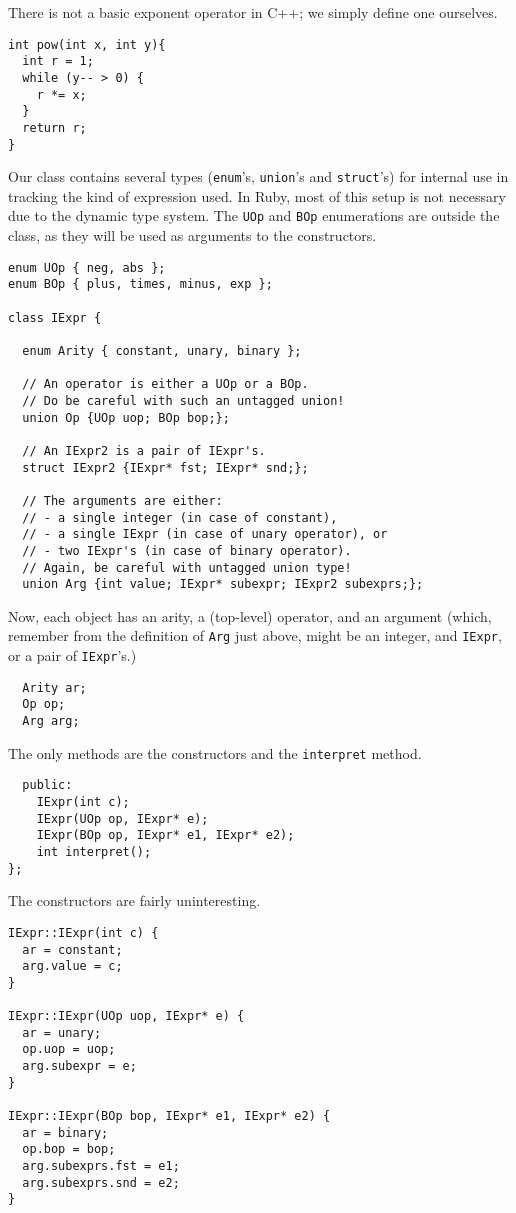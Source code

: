\documentclass[11pt]{article}
\begin{document}
There is not a basic exponent operator in C++;
we simply define one ourselves.
\begin{verbatim}
int pow(int x, int y){
  int r = 1;
  while (y-- > 0) {
    r *= x;
  }
  return r;
}
\end{verbatim}

Our class contains several types (\texttt{enum}'s, \texttt{union}'s and \texttt{struct}'s)
for internal use in tracking the kind of expression used.
In Ruby, most of this setup is not necessary due to
the dynamic type system.
The \texttt{UOp} and \texttt{BOp} enumerations are outside the class,
as they will be used as arguments to the constructors.
\begin{verbatim}
enum UOp { neg, abs };
enum BOp { plus, times, minus, exp };

class IExpr {

  enum Arity { constant, unary, binary };

  // An operator is either a UOp or a BOp.
  // Do be careful with such an untagged union!
  union Op {UOp uop; BOp bop;};

  // An IExpr2 is a pair of IExpr's.
  struct IExpr2 {IExpr* fst; IExpr* snd;};

  // The arguments are either:
  // - a single integer (in case of constant),
  // - a single IExpr (in case of unary operator), or
  // - two IExpr's (in case of binary operator).
  // Again, be careful with untagged union type!
  union Arg {int value; IExpr* subexpr; IExpr2 subexprs;};
\end{verbatim}

Now, each object has an arity, a (top-level) operator,
and an argument (which, remember from the definition of \texttt{Arg} just above,
might be an integer, and \texttt{IExpr}, or a pair of \texttt{IExpr}'s.)
\begin{verbatim}
  Arity ar;
  Op op;
  Arg arg;
\end{verbatim}

The only methods are the constructors and the \texttt{interpret} method.
\begin{verbatim}
  public:
    IExpr(int c);
    IExpr(UOp op, IExpr* e);
    IExpr(BOp op, IExpr* e1, IExpr* e2);
    int interpret();
};
\end{verbatim}

The constructors are fairly uninteresting.
\begin{verbatim}
IExpr::IExpr(int c) {
  ar = constant;
  arg.value = c;
}

IExpr::IExpr(UOp uop, IExpr* e) {
  ar = unary;
  op.uop = uop;
  arg.subexpr = e;
}

IExpr::IExpr(BOp bop, IExpr* e1, IExpr* e2) {
  ar = binary;
  op.bop = bop;
  arg.subexprs.fst = e1;
  arg.subexprs.snd = e2;
}
\end{verbatim}
\end{document}
